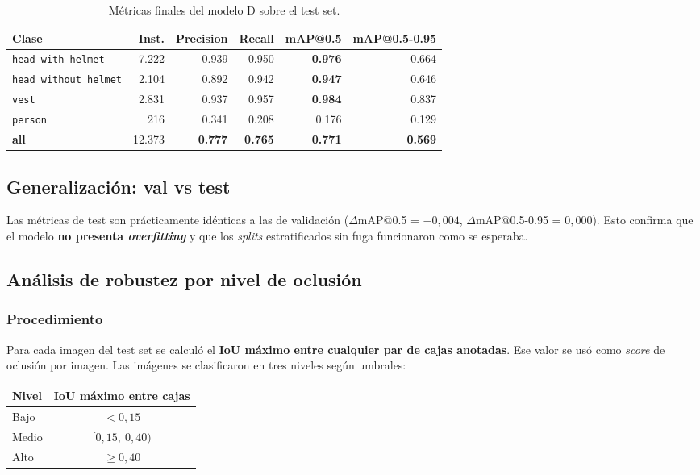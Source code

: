 \documentclass[11pt,a4paper]{article}
\begin{document}
\begin{table}[H]
\centering
\caption{Métricas finales del modelo D sobre el test set.}
\label{tab:test_final}
\begin{tabular}{l r r r r r}
\toprule
\textbf{Clase} & \textbf{Inst.} & \textbf{Precision} & \textbf{Recall}
& \textbf{mAP@0.5} & \textbf{mAP@0.5-0.95} \\
\midrule
\texttt{head\_with\_helmet} & 7.222 & 0.939 & 0.950 & \textbf{0.976} & 0.664 \\
\texttt{head\_without\_helmet} & 2.104 & 0.892 & 0.942 & \textbf{0.947} & 0.646 \\
\texttt{vest} & 2.831 & 0.937 & 0.957 & \textbf{0.984} & 0.837 \\
\texttt{person} & 216 & 0.341 & 0.208 & 0.176 & 0.129 \\
\midrule
\textbf{all} & 12.373 & \textbf{0.777} & \textbf{0.765} & \textbf{0.771} & \textbf{0.569} \\
\bottomrule
\end{tabular}
\end{table}

\subsection{Generalización: val vs test}

Las métricas de test son prácticamente idénticas a las de validación
($\Delta$mAP@0.5 = $-0{,}004$, $\Delta$mAP@0.5-0.95 = $0{,}000$).
Esto confirma que el modelo \textbf{no presenta \textit{overfitting}} y
que los \textit{splits} estratificados sin fuga funcionaron como se
esperaba.

\subsection{Análisis de robustez por nivel de oclusión}
\label{sec:oclusion}

\subsubsection{Procedimiento}

Para cada imagen del test set se calculó el \textbf{IoU máximo entre
cualquier par de cajas anotadas}. Ese valor se usó como \emph{score} de
oclusión por imagen. Las imágenes se clasificaron en tres niveles
según umbrales:

\begin{table}[H]
\centering
\begin{tabular}{l c}
\toprule
\textbf{Nivel} & \textbf{IoU máximo entre cajas} \\
\midrule
Bajo & $<0{,}15$ \\
Medio & $[0{,}15,\ 0{,}40)$ \\
Alto & $\geq 0{,}40$ \\
\bottomrule
\end{tabular}
\end{table}
\end{document}
